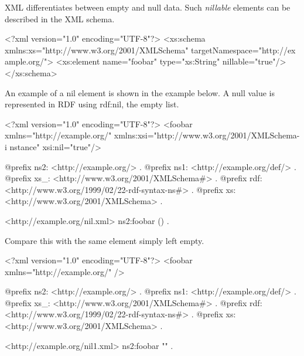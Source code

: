 XML differentiates between empty and null data. Such {\itshape nillable\/} elements can be described in the XML schema.


\begin{DoxyCodeInclude}
<?xml version="1.0" encoding="UTF-8"?>
<xs:schema xmlns:xs="http://www.w3.org/2001/XMLSchema" targetNamespace="http://ex
      ample.org/">
        <xs:element name="foobar" type="xs:String" nillable="true"/>
</xs:schema>
\end{DoxyCodeInclude}


An example of a nil element is shown in the example below. A null value is represented in RDF using rdf:nil, the empty list.


\begin{DoxyCodeInclude}
<?xml version="1.0" encoding="UTF-8"?>
<foobar xmlns="http://example.org/" xmlns:xsi="http://www.w3.org/2001/XMLSchema-i
      nstance" 
 xsi:nil="true"/>

\end{DoxyCodeInclude}
 
\begin{DoxyCodeInclude}
@prefix ns2:     <http://example.org/> .
@prefix ns1:     <http://example.org/def/> .
@prefix xs_:     <http://www.w3.org/2001/XMLSchema#> .
@prefix rdf:     <http://www.w3.org/1999/02/22-rdf-syntax-ns#> .
@prefix xs:      <http://www.w3.org/2001/XMLSchema> .

<http://example.org/nil.xml>
      ns2:foobar () .
\end{DoxyCodeInclude}


Compare this with the same element simply left empty.


\begin{DoxyCodeInclude}
<?xml version="1.0" encoding="UTF-8"?>
<foobar xmlns="http://example.org/" />

\end{DoxyCodeInclude}
 
\begin{DoxyCodeInclude}
@prefix ns2:     <http://example.org/> .
@prefix ns1:     <http://example.org/def/> .
@prefix xs_:     <http://www.w3.org/2001/XMLSchema#> .
@prefix rdf:     <http://www.w3.org/1999/02/22-rdf-syntax-ns#> .
@prefix xs:      <http://www.w3.org/2001/XMLSchema> .

<http://example.org/nil1.xml>
      ns2:foobar "" .
\end{DoxyCodeInclude}
 